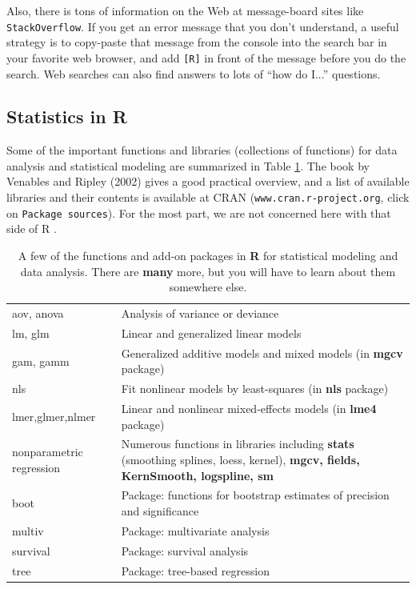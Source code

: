 \documentclass [11pt]{article}
\newcommand{\ttt}[1]{\texttt{#1}}
\numberwithin{exercise}{section}
\def\R{R }
\begin{document}
Also, there is tons of information on the Web at message-board sites like  
\texttt{StackOverflow}. If you get an error message that you don't
understand, a useful strategy is to copy-paste that message from the console into the
search bar in your favorite web browser, and add \texttt{[R]} in front of the message 
before you do the search. Web searches can also find answers to lots of ``how do I...'' questions. 

\subsection*{Statistics in \R}
Some of the important functions and libraries (collections of functions) for data analysis
and statistical modeling are summarized in Table 
\ref{StatModelingFunctions}. The book by Venables and Ripley (2002) gives a good practical overview, and a 
list of available libraries and their contents is available at CRAN 
(\ttt{www.cran.r-project.org}, click on \ttt{Package sources}). For the most part, we are 
not concerned here with that side of \R. 

\begin{table}[t!]
\begin{tabular}{p{140pt}p{290pt}}
\hline
aov, anova & Analysis of variance or deviance\\
lm, glm &  Linear and generalized linear models\\
gam, gamm & Generalized additive models and mixed models (in \textbf{mgcv} package) \\
nls & Fit nonlinear models by least-squares (in \textbf{nls} package)\\
lmer,glmer,nlmer & Linear and nonlinear mixed-effects models (in \textbf{lme4} package) \\
nonparametric regression & Numerous functions in libraries including
\textbf{stats} (smoothing splines, loess, kernel), \textbf{mgcv, fields, KernSmooth, logspline, sm} \\
boot & Package: functions for bootstrap estimates of precision and significance \\
multiv & Package: multivariate analysis \\
survival & Package: survival analysis \\
tree & Package: tree-based regression \\
\hline 
\end{tabular}
\caption{\small{A few of the functions and add-on packages in {\bf R} for statistical
modeling and data analysis. There are \textbf{many} more, but you will have
to learn about them somewhere else.}} 
\label{StatModelingFunctions}
\end{table}
\end{document}
